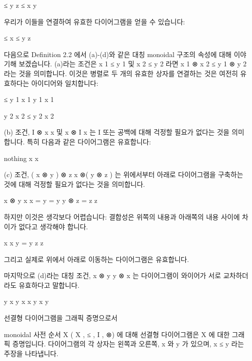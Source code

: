 \documentclass[11pt, a4paper, twoside, openany]{book}
\begin{document}
\par\medskip
≤
y
z
≤
x
y

\par\medskip
우리가 이들을 연결하여 유효한 다이어그램을 얻을 수 있습니다:

\par\medskip
≤
x
≤
y
z

\par\medskip
다음으로 Deﬁnition 2.2 에서 (a)-(d)와 같은 대칭 monoidal 구조의 속성에 대해 이야기해 보겠습니다. (a)라는 조건은 x 1 ≤ y 1 및 x 2 ≤ y 2 라면 x 1 ⊗ x 2 ≤ y 1 ⊗ y 2 라는 것을 의미합니다. 이것은 병렬로 두 개의 유효한 상자를 연결하는 것은 여전히 유효하다는 아이디어와 일치합니다:

\par\medskip
≤
y 1
x 1
y 1
x 1
{
y 2
x 2
≤
y 2
x 2

\par\medskip
(b) 조건, I ⊗ x  x 및 x ⊗ I  x 는 I 또는 공백에 대해 걱정할 필요가 없다는 것을 의미합니다. 특히 다음과 같은 다이어그램은 유효합니다:

\par\medskip
nothing
x
x

\par\medskip
(c) 조건, ( x ⊗ y ) ⊗ z  x ⊗( y ⊗ z ) 는 위에서부터 아래로 다이어그램을 구축하는 것에 대해 걱정할 필요가 없다는 것을 의미합니다.

\par\medskip
x ⊗ y
x
x
=
y
=
y
y ⊗ z
=
z
z

\par\medskip
하지만 이것은 생각보다 어렵습니다: 결합성은 위쪽의 내용과 아래쪽의 내용 사이에 차이가 없다고 생각해야 합니다.

\par\medskip
x
x
y
=
y
z
z

\par\medskip
그리고 실제로 위에서 아래로 이동하는 다이어그램은 유효합니다.

\par\medskip
마지막으로 (d)라는 대칭 조건, x ⊗ y  y ⊗ x 는 다이어그램이 와이어가 서로 교차하더라도 유효하다고 말합니다.

\par\medskip
y
x
y
x
x
y
x
y

\par\medskip
선결형 다이어그램을 그래픽 증명으로서

\par\medskip
monoidal 사전 순서 X  ( X , ≤ , I , ⊗) 에 대해 선결형 다이어그램은 X 에 대한 그래픽 증명입니다. 다이어그램의 각 상자는 왼쪽과 오른쪽, x 와 y 가 있으며, x ≤ y 라는 주장을 나타냅니다.

}
\end{document}
